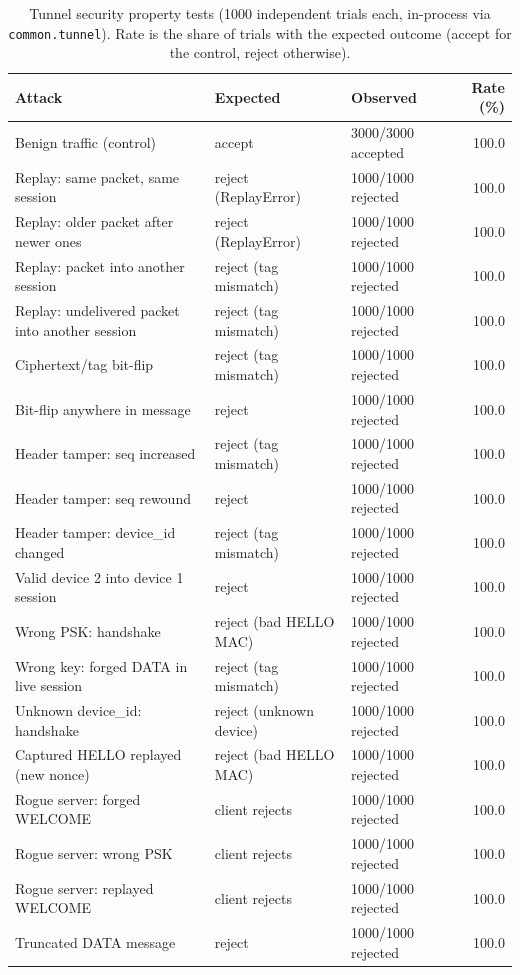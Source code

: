 \begin{table}[t]
\centering
\caption{Tunnel security property tests (1000 independent trials each, in-process via \texttt{common.tunnel}). Rate is the share of trials with the expected outcome (accept for the control, reject otherwise).}
\label{tab:sys_security}
\scriptsize
\begin{tabular}{p{3.3cm}p{2.4cm}p{1.7cm}r}
\toprule
Attack & Expected & Observed & Rate (\%) \\
\midrule
Benign traffic (control) & accept & 3000/3000 accepted & 100.0 \\
Replay: same packet, same session & reject (ReplayError) & 1000/1000 rejected & 100.0 \\
Replay: older packet after newer ones & reject (ReplayError) & 1000/1000 rejected & 100.0 \\
Replay: packet into another session & reject (tag mismatch) & 1000/1000 rejected & 100.0 \\
Replay: undelivered packet into another session & reject (tag mismatch) & 1000/1000 rejected & 100.0 \\
Ciphertext/tag bit-flip & reject (tag mismatch) & 1000/1000 rejected & 100.0 \\
Bit-flip anywhere in message & reject & 1000/1000 rejected & 100.0 \\
Header tamper: seq increased & reject (tag mismatch) & 1000/1000 rejected & 100.0 \\
Header tamper: seq rewound & reject & 1000/1000 rejected & 100.0 \\
Header tamper: device\_id changed & reject (tag mismatch) & 1000/1000 rejected & 100.0 \\
Valid device 2 into device 1 session & reject & 1000/1000 rejected & 100.0 \\
Wrong PSK: handshake & reject (bad HELLO MAC) & 1000/1000 rejected & 100.0 \\
Wrong key: forged DATA in live session & reject (tag mismatch) & 1000/1000 rejected & 100.0 \\
Unknown device\_id: handshake & reject (unknown device) & 1000/1000 rejected & 100.0 \\
Captured HELLO replayed (new nonce) & reject (bad HELLO MAC) & 1000/1000 rejected & 100.0 \\
Rogue server: forged WELCOME & client rejects & 1000/1000 rejected & 100.0 \\
Rogue server: wrong PSK & client rejects & 1000/1000 rejected & 100.0 \\
Rogue server: replayed WELCOME & client rejects & 1000/1000 rejected & 100.0 \\
Truncated DATA message & reject & 1000/1000 rejected & 100.0 \\
\bottomrule
\end{tabular}
\end{table}
